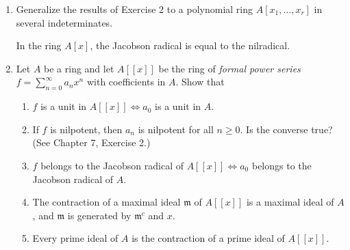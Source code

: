 \begin{enumerate}
\amstaritem Let $x$ be a nilpotent element of a ring $A$. Show that $1+x$ is a unit of $A$. Deduce that the sum of a nilpotent element and a unit is a unit.

\amstaritem Let $A$ be a ring and let $A[x]$ be the ring of polynomials in an indeterminate $x$, with coefficients in $A$. Let $f=a_0+a_1x+\cdots+a_nx^n\in A[x]$. Prove that
\begin{enumerate}
\renewcommand{\labelenumii}{\roman{enumii})}
\item $f$ is a unit in $A[x]\Longleftrightarrow a_0$ is a unit in $A$ and $a_1,\ldots,a_n$ are nilpotent. [If $b_0+b_1x+\cdots+b_mx^m$ is the inverse of $f$, prove by induction on $r$ that $a_n^{r+1}b_{m-r}=0$. Hence show that $a_n$ is nilpotent, and then use Ex. 1.]
\item $f$ is nilpotent $\Longleftrightarrow a_0,a_1,\ldots,a_n$ are nilpotent.
\item $f$ is a zero-divisor $\Longleftrightarrow$ there exists $a\neq0$ in $A$ such that $af=0$. [Choose a polynomial $g=b_0+b_1x+\cdots+b_mx^m$ of least degree $m$ such that $fg=0$. Then $a_nb_m=0$, hence $a_ng=0$ (because $a_ng$ annihilates $f$ and has degree $<m$). Now show by induction that $a_{n-r}g=0$ $(0\leq r\leq n)$.]
\item $f$ is said to be \textit{primitive} if $(a_0,a_1,\ldots,a_n)=(1)$. Prove that if $f,g\in A[x]$, then $fg$ is primitive $\Longleftrightarrow f$ and $g$ are primitive.
\end{enumerate}

\item Generalize the results of Exercise 2 to a polynomial ring $A[x_1,\ldots,x_r]$ in several indeterminates.

\amstaritem In the ring $A[x]$, the Jacobson radical is equal to the nilradical.

\item Let $A$ be a ring and let $A[[x]]$ be the ring of \textit{formal power series} $f=\sum_{n=0}^\infty a_nx^n$ with coefficients in $A$. Show that
\begin{enumerate}
\renewcommand{\labelenumii}{\roman{enumii})}
\item $f$ is a unit in $A[[x]]\Longleftrightarrow a_0$ is a unit in $A$.
\item If $f$ is nilpotent, then $a_n$ is nilpotent for all $n\geq0$. Is the converse true? (See Chapter 7, Exercise 2.)
\item $f$ belongs to the Jacobson radical of $A[[x]]\Longleftrightarrow a_0$ belongs to the Jacobson radical of $A$.
\item The contraction of a maximal ideal $\mathfrak m$ of $A[[x]]$ is a maximal ideal of $A$, and $\mathfrak m$ is generated by $\mathfrak m^c$ and $x$.
\item Every prime ideal of $A$ is the contraction of a prime ideal of $A[[x]]$.
\end{enumerate}


\end{enumerate}
